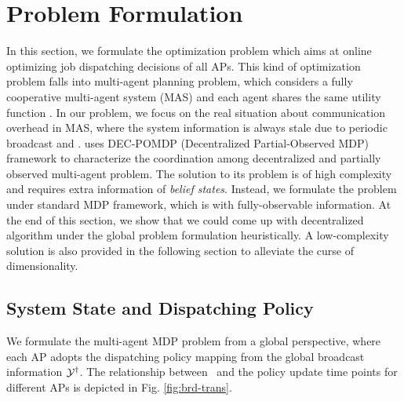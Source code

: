 \section{Problem Formulation}
In this section, we formulate the optimization problem which aims at online optimizing job dispatching decisions of all APs.
This kind of optimization problem falls into multi-agent planning problem, which considers a fully cooperative multi-agent system (MAS) and each agent shares the same utility function .
In our problem, we focus on the real situation about communication overhead in MAS, where the system information is always stale due to periodic broadcast and \brlatency.
 uses DEC-POMDP (Decentralized Partial-Observed MDP) framework to characterize the coordination among decentralized and partially observed multi-agent problem. The solution to its problem is of high complexity and requires extra information of \emph{belief states}.
Instead, we formulate the problem under standard MDP framework, which is with fully-observable information.
At the end of this section, we show that we could come up with decentralized algorithm under the global problem formulation heuristically. A low-complexity solution is also provided in the following section to alleviate the curse of dimensionality.

\subsection{System State and Dispatching Policy}
We formulate the multi-agent MDP problem from a global perspective, where each AP adopts the dispatching policy mapping from the global broadcast information $\mathcal{Y}^{\dagger}$.
The relationship between \brlatency~and the policy update time points for different APs is depicted in Fig. \ref{fig:brd-trans}.



